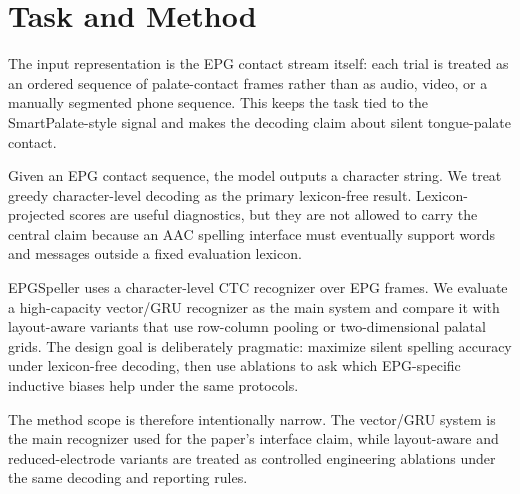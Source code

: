 
\section{Task and Method}
The input representation is the EPG contact stream itself: each trial is treated as an ordered sequence of palate-contact frames rather than as audio, video, or a manually segmented phone sequence. This keeps the task tied to the SmartPalate-style signal and makes the decoding claim about silent tongue-palate contact.


Given an EPG contact sequence, the model outputs a character string. We treat greedy character-level decoding as the primary lexicon-free result. Lexicon-projected scores are useful diagnostics, but they are not allowed to carry the central claim because an AAC spelling interface must eventually support words and messages outside a fixed evaluation lexicon.


EPGSpeller uses a character-level CTC recognizer over EPG frames. We evaluate a high-capacity vector/GRU recognizer as the main system and compare it with layout-aware variants that use row-column pooling or two-dimensional palatal grids. The design goal is deliberately pragmatic: maximize silent spelling accuracy under lexicon-free decoding, then use ablations to ask which EPG-specific inductive biases help under the same protocols.


The method scope is therefore intentionally narrow. The vector/GRU system is the main recognizer used for the paper's interface claim, while layout-aware and reduced-electrode variants are treated as controlled engineering ablations under the same decoding and reporting rules.

